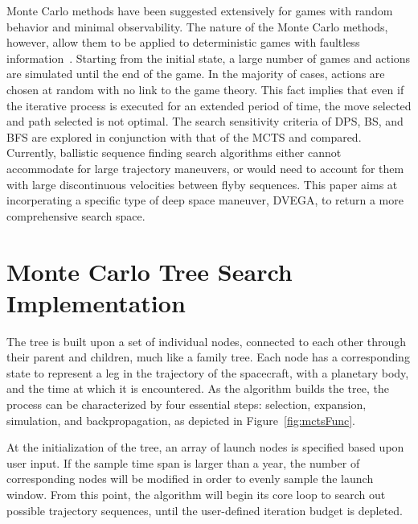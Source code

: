 \documentclass[letterpaper, preprint, paper,11pt]{AAS}	%
\newcommand*\circled[1]{\tikz[baseline=(char.base)]{
            \node[shape=circle,draw,inner sep=0.8pt] (char) {#1};}}
\begin{document}
Monte Carlo methods have been suggested extensively for games with random behavior and minimal observability. The nature of the Monte Carlo methods, however, allow them to be applied to deterministic games with faultless information~\cite{Browne2012}. Starting from the initial state, a large number of games and actions are simulated until the end of the game. In the majority of cases, actions are chosen at random with no link to the game theory. This fact implies that even if the iterative process is executed for an extended period of time, the move selected and path selected is not optimal. The search sensitivity criteria of DPS, BS, and BFS are explored in conjunction with that of the MCTS and compared. Currently, ballistic sequence finding search algorithms either cannot accommodate for large trajectory maneuvers, or would need to account for them with large discontinuous velocities between flyby sequences. This paper aims at incorperating a specific type of deep space maneuver, DVEGA, to return a more comprehensive search space.

\section*{Monte Carlo Tree Search Implementation}

The tree is built upon a set of individual nodes, connected to each other through their parent and children, much like a family tree. Each node has a corresponding state to represent a leg in the trajectory of the spacecraft, with a planetary body, and the time at which it is encountered. As the algorithm builds the tree, the process can be characterized by four essential steps: \circled{1} selection,\hspace{1em} \circled{2} expansion, \circled{3} simulation, and \circled{4} backpropagation, as depicted in Figure~\ref*{fig:mctsFunc}.

At the initialization of the tree, an array of launch nodes is specified based upon user input. If the sample time span is larger than a year, the number of corresponding nodes will be modified in order to evenly sample the launch window. From this point, the algorithm will begin its core loop to search out possible trajectory sequences, until the user-defined iteration budget is depleted.
\end{document}
